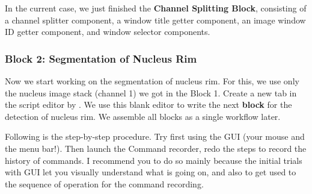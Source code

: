 In the current case, we just finished the \textbf{Channel Splitting Block}, consisting of a channel splitter component, a window title getter component, an image window ID getter component, and window selector components. 

\subsubsection{Block 2: Segmentation of Nucleus Rim}

Now we start working on the segmentation of nucleus rim. For this, we use only the nucleus image stack (channel 1) we got in the Block 1. Create a new tab in the script editor by . We use this blank editor to  write the next \textbf{block} for the detection of nucleus rim. We assemble all blocks as a single workflow later. 

Following is the step-by-step procedure. Try first using the GUI (your mouse and the menu bar!). Then launch the Command recorder, redo the steps to record the history of commands. I recommend you to do so mainly because the initial trials with GUI let you visually understand what is going on, and also to get used to the sequence of operation for the command recording. 

